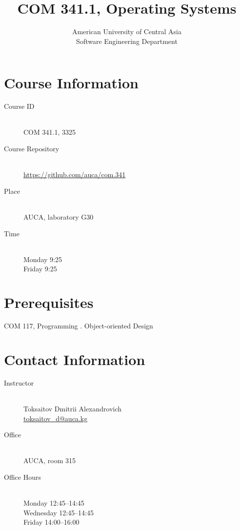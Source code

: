 \documentclass[12pt,a4paper,oneside]{article}
\newcommand{\R}[1]{\uppercase\expandafter{\romannumeral #1\relax}}
\begin{document}
    \title{COM 341.1, Operating Systems}
    \author{
        American University of Central Asia\\
        Software Engineering Department
    }
    \date{}
    \maketitle

    \section{Course Information}

        \begin{description}
            \item[Course ID]\hfill\\
                COM 341.1, 3325
            \item[Course Repository]\hfill\\
                \url{https://github.com/auca/com.341}
            \item[Place]\hfill\\
                AUCA, laboratory G30
            \item[Time]\hfill\\
                Monday 9:25\\
                Friday 9:25
        \end{description}

    \section{Prerequisites}

        COM 117, Programming \R{2}. Object-oriented Design

        \section{Contact Information}

            \begin{description}
                \item[Instructor]\hfill\\
                    Toksaitov Dmitrii Alexandrovich\\
                    \href{mailto:toksaitov_d@auca.kg}{toksaitov\_d@auca.kg}
                \item[Office]\hfill\\
                    AUCA, room 315
                \item[Office Hours]\hfill\\
                    Monday 12:45--14:45\\
                    Wednesday 12:45--14:45\\
                    Friday 14:00--16:00
            \end{description}
\end{document}
